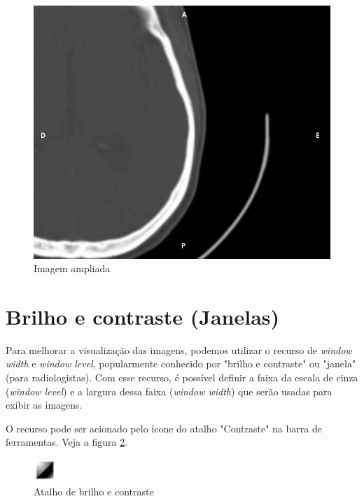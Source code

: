 \begin{figure}[!htb]
\centering
\includegraphics[scale=0.15]{../user_guide_figures/invesalius_screen/tool_image_with_zoom.jpg}
\caption{Imagem ampliada}
\label{fig:zoom_applied}
\end{figure}


\section{Brilho e contraste (Janelas)}
\label{sec:ww_wl}

Para melhorar a visualização das imagens, podemos utilizar o recurso de \textit{window width} e
\textit{window level}, popularmente conhecido por "brilho e contraste" ou "janela" (para radiologistas). 
Com esse recurso, é possível definir a faixa da escala de cinza (\textit{window level}) e a
largura dessa faixa (\textit{window width}) que serão usadas para exibir as imagens.

O recurso pode ser acionado pelo ícone do atalho "Contraste" na barra de ferramentas. Veja a figura \ref{fig:window_level_shortcut}.

\begin{figure}[!htb]
\centering
\includegraphics[scale=0.70]{../user_guide_figures/icons/tool_contrast_original.png}
\caption{Atalho de brilho e contraste}
\label{fig:window_level_shortcut}
\end{figure}

